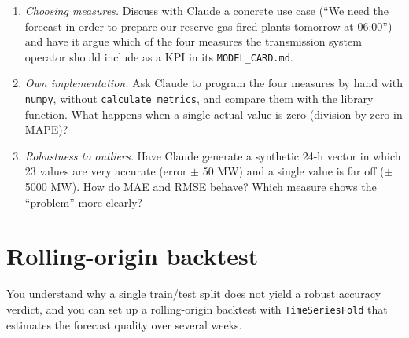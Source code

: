 \documentclass[
  english,
  letterpaper,
]{scrbook}
\providecommand{\tightlist}{%
  \setlength{\itemsep}{0pt}\setlength{\parskip}{0pt}}
\begin{document}
\begin{tcolorbox}[enhanced jigsaw, arc=.35mm, bottomrule=.15mm, bottomtitle=1mm, breakable, colback=white, colbacktitle=quarto-callout-tip-color!10!white, colframe=quarto-callout-tip-color-frame, coltitle=black, left=2mm, leftrule=.75mm, opacityback=0, opacitybacktitle=0.6, rightrule=.15mm, title=\textcolor{quarto-callout-tip-color}{\faLightbulb}\hspace{0.5em}{Exercises (with Claude)}, titlerule=0mm, toprule=.15mm, toptitle=1mm]

\begin{enumerate}
\def\labelenumi{\arabic{enumi}.}
\tightlist
\item
  \emph{Choosing measures.} Discuss with Claude a concrete use case
  (``We need the forecast in order to prepare our reserve gas-fired
  plants tomorrow at 06:00'') and have it argue which of the four
  measures the transmission system operator should include as a KPI in
  its \texttt{MODEL\_CARD.md}.
\item
  \emph{Own implementation.} Ask Claude to program the four measures by
  hand with \texttt{numpy}, without \texttt{calculate\_metrics}, and
  compare them with the library function. What happens when a single
  actual value is zero (division by zero in MAPE)?
\item
  \emph{Robustness to outliers.} Have Claude generate a synthetic 24-h
  vector in which 23 values are very accurate (error \(\pm\) 50 MW) and
  a single value is far off (\(\pm\) 5000 MW). How do MAE and RMSE
  behave? Which measure shows the ``problem'' more clearly?
\end{enumerate}

\end{tcolorbox}


\chapter{Rolling-origin backtest}\label{sec-backtest}

\begin{tcolorbox}[enhanced jigsaw, arc=.35mm, bottomrule=.15mm, bottomtitle=1mm, breakable, colback=white, colbacktitle=quarto-callout-note-color!10!white, colframe=quarto-callout-note-color-frame, coltitle=black, left=2mm, leftrule=.75mm, opacityback=0, opacitybacktitle=0.6, rightrule=.15mm, title=\textcolor{quarto-callout-note-color}{\faInfo}\hspace{0.5em}{Learning objective}, titlerule=0mm, toprule=.15mm, toptitle=1mm]

You understand why a single train/test split does not yield a robust
accuracy verdict, and you can set up a rolling-origin backtest with
\texttt{TimeSeriesFold} that estimates the forecast quality over several
weeks.

\end{tcolorbox}
\end{document}
